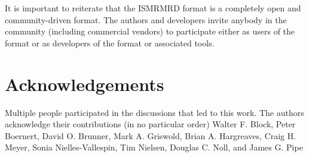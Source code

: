 \documentclass[12pt]{article}
\begin{document}
It is important to reiterate that the ISMRMRD format is a completely open and community-driven format. The authors and developers invite anybody in the community (including commercial vendors) to participate either as users of the format or as developers of the format or associated tools.

\section*{Acknowledgements}
Multiple people participated in the discussions that led to this work.  The authors acknowledge their contributions (in no particular order) 
Walter F. Block,
Peter Boernert,
David O. Brunner,
Mark A. Griswold,
Brian A. Hargreaves,
Craig H. Meyer,
Sonia Nielles-Vallespin,
Tim Nielsen, 
Douglas C. Noll, and
James G. Pipe


\end{document}
